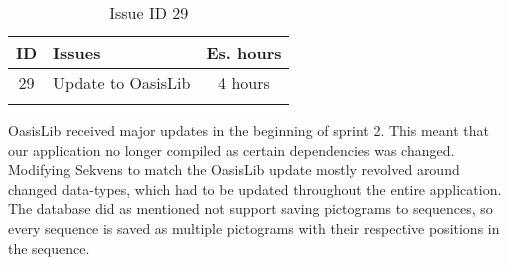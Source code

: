 \begin{longtable} { | c | p{12cm} | c | } 
\hline
	ID 	&	Issues	&		 Es. hours \\\hline
	29 	&	Update to OasisLib	&	4 hours \\\hline
\caption{Issue ID 29}
\label{tab:spr2_oasislib}
\end{longtable}

OasisLib received major updates in the beginning of sprint 2. This meant that our application no longer compiled as certain dependencies was changed. Modifying Sekvens to match the OasisLib update mostly revolved around changed data-types, which had to be updated throughout the entire application.
The database did as mentioned not support saving pictograms to sequences, so every sequence is saved as multiple pictograms with their respective positions in the sequence.
